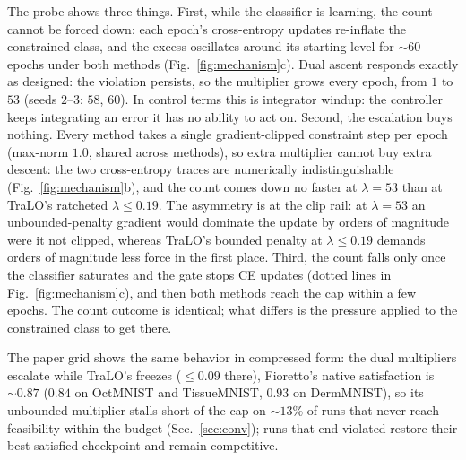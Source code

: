 \documentclass[10pt]{article}
\begin{document}
The probe shows three things. First, while the classifier is learning,
the count cannot be forced down: each epoch's cross-entropy updates
re-inflate the constrained class, and the excess oscillates around its
starting level for ${\sim}60$ epochs under both methods
(Fig.~\ref{fig:mechanism}c). Dual ascent responds exactly as designed:
the violation persists, so the multiplier grows every epoch, from $1$ to
$53$ (seeds $2$--$3$: $58$, $60$). In control terms this is integrator
windup: the controller keeps integrating an error it has no ability to
act on. Second, the escalation buys nothing. Every method takes a
single gradient-clipped constraint step per epoch (max-norm $1.0$,
shared across methods), so extra multiplier cannot buy extra descent:
the two cross-entropy traces are numerically indistinguishable
(Fig.~\ref{fig:mechanism}b), and the count comes down no faster at
$\lambda{=}53$ than at TraLO's ratcheted $\lambda\le 0.19$. %
{The asymmetry is at the clip rail: at $\lambda{=}53$ an}
unbounded-penalty gradient would dominate the update by orders of
magnitude were it not clipped, whereas TraLO's bounded penalty at
$\lambda\le 0.19$ demands orders of magnitude less force in the first
place. Third, the count falls only once the classifier saturates and the
gate stops CE updates (dotted lines in Fig.~\ref{fig:mechanism}c), and
then both methods reach the cap within a few epochs. The count outcome is
identical; what differs is the pressure applied to the constrained class
to get there.

The paper grid shows the same behavior in compressed form: the dual
multipliers escalate while TraLO's freezes ($\le 0.09$ there),
Fioretto's native satisfaction is ${\sim}0.87$ ($0.84$ on OctMNIST and
TissueMNIST, $0.93$ on DermMNIST), so its unbounded multiplier stalls
short of the cap on ${\sim}13\%$ of runs that never reach feasibility
within the budget (Sec.~\ref{sec:conv}); runs that end violated restore
their best-satisfied checkpoint and remain competitive.
\end{document}
